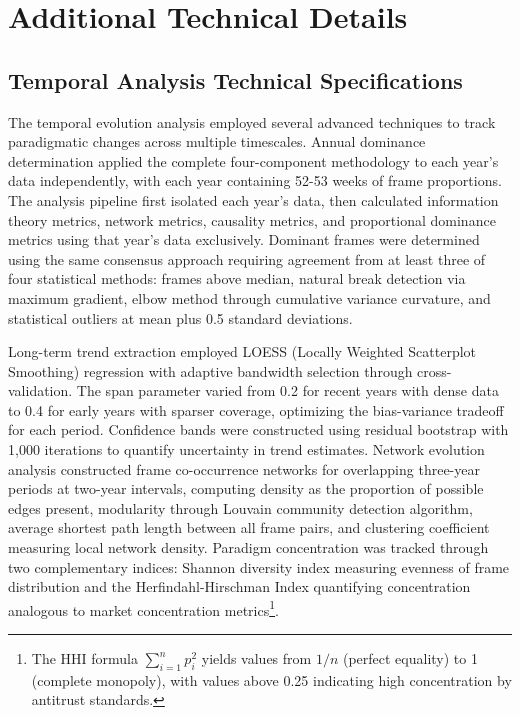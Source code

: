 \documentclass[12pt]{article}
\begin{document}
\section{Additional Technical Details}
\label{sec:technical}

\subsection{Temporal Analysis Technical Specifications}

The temporal evolution analysis employed several advanced techniques to track paradigmatic changes across multiple timescales. Annual dominance determination applied the complete four-component methodology to each year's data independently, with each year containing 52-53 weeks of frame proportions. The analysis pipeline first isolated each year's data, then calculated information theory metrics, network metrics, causality metrics, and proportional dominance metrics using that year's data exclusively. Dominant frames were determined using the same consensus approach requiring agreement from at least three of four statistical methods: frames above median, natural break detection via maximum gradient, elbow method through cumulative variance curvature, and statistical outliers at mean plus 0.5 standard deviations.

Long-term trend extraction employed LOESS (Locally Weighted Scatterplot Smoothing) regression with adaptive bandwidth selection through cross-validation. The span parameter varied from 0.2 for recent years with dense data to 0.4 for early years with sparser coverage, optimizing the bias-variance tradeoff for each period. Confidence bands were constructed using residual bootstrap with 1,000 iterations to quantify uncertainty in trend estimates. Network evolution analysis constructed frame co-occurrence networks for overlapping three-year periods at two-year intervals, computing density as the proportion of possible edges present, modularity through Louvain community detection algorithm, average shortest path length between all frame pairs, and clustering coefficient measuring local network density. Paradigm concentration was tracked through two complementary indices: Shannon diversity index measuring evenness of frame distribution and the Herfindahl-Hirschman Index quantifying concentration analogous to market concentration metrics\footnote{The HHI formula $\sum_{i=1}^{n} p_i^2$ yields values from $1/n$ (perfect equality) to 1 (complete monopoly), with values above 0.25 indicating high concentration by antitrust standards.}.
\end{document}

